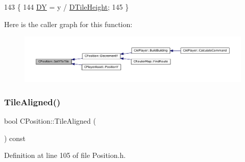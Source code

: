 \begin{DoxyCode}
143                                \{
144     \hyperlink{classCPosition_a84139c9e8eb547e7cf3cb851739943a4}{DY} = y / \hyperlink{classCPosition_a202ebb83e86df75cfb76cf1241ba817c}{DTileHeight};
145 \}
\end{DoxyCode}
Here is the caller graph for this function\+:
\nopagebreak
\begin{figure}[H]
\begin{center}
\leavevmode
\includegraphics[width=350pt]{classCPosition_a5805485f623398197ac595a5d389f691_icgraph}
\end{center}
\end{figure}
\hypertarget{classCPosition_abe4ef039d9bbf51cd542167b5a0cd88e}{}\label{classCPosition_abe4ef039d9bbf51cd542167b5a0cd88e} 
\subsubsection{\texorpdfstring{Tile\+Aligned()}{TileAligned()}}
{\footnotesize\ttfamily bool C\+Position\+::\+Tile\+Aligned (\begin{DoxyParamCaption}{ }\end{DoxyParamCaption}) const\hspace{0.3cm}{\ttfamily [inline]}}



Definition at line 105 of file Position.\+h.



